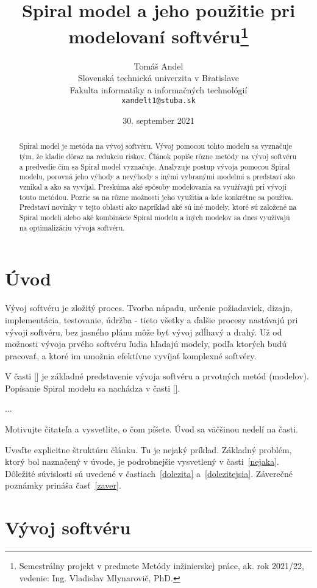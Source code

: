 \documentclass[10pt,twoside,slovak,a4paper]{article}
\title{Spiral model a jeho použitie pri modelovaní softvéru\thanks{Semestrálny projekt v predmete Metódy inžinierskej práce, ak. rok 2021/22, vedenie: Ing. Vladislav Mlynarovič, PhD.}}
\author{Tomáš Andel\\[2pt]
	{\small Slovenská technická univerzita v Bratislave}\\
	{\small Fakulta informatiky a informačných technológií}\\
	{\small \texttt{xandelt1@stuba.sk}}
	}
\date{\small 30. september 2021}
\begin{document}
\maketitle

\begin{abstract}
Spiral model je metóda na vývoj softvéru. Vývoj pomocou tohto modelu sa vyznačuje tým, že kladie dôraz na redukciu riskov. Článok popíše rôzne metódy na vývoj softvéru a predvedie čím sa Spiral model vyznačuje. Analyzuje postup vývoja pomocou Spiral modelu, porovná jeho výhody a nevýhody s inými vybranými modelmi a predstaví ako vznikal a ako sa vyvíjal. Preskúma aké spôsoby modelovania sa využívajú pri vývoji touto metódou. Pozrie sa na rôzne možnosti jeho využitia a kde konkrétne sa používa. Predstaví novinky v tejto oblasti ako napríklad aké sú iné modely, ktoré sú založené na Spiral modeli alebo aké kombinácie Spiral modelu a iných modelov sa dnes využívajú na optimalizáciu vývoja softvéru.
\end{abstract}

\section{Úvod}

Vývoj softvéru je zložitý proces. Tvorba nápadu, určenie požiadaviek, dizajn, implementácia, testovanie, údržba - tieto všetky a ďalšie procesy nastávajú pri vývoji softvéru, bez jasného plánu môže byť vývoj zdĺhavý a drahý. Už od možnosti vývoja prvého softvéru ľudia hľadajú modely, podľa ktorých budú pracovať, a ktoré im umožnia efektívne vyvíjať komplexné softvéry.

V časti [] je základné predstavenie vývoja softvéru a prvotných metód (modelov). Popísanie Spiral modelu sa nachádza v časti []. 

...

Motivujte čitateľa a vysvetlite, o čom píšete. Úvod sa väčšinou nedelí na časti.

Uveďte explicitne štruktúru článku. Tu je nejaký príklad.
Základný problém, ktorý bol naznačený v úvode, je podrobnejšie vysvetlený v časti~\ref{nejaka}.
Dôležité súvislosti sú uvedené v častiach~\ref{dolezita} a~\ref{dolezitejsia}.
Záverečné poznámky prináša časť~\ref{zaver}.



\section{Vývoj softvéru} \label{vyvojSoftveru}
\end{document}
